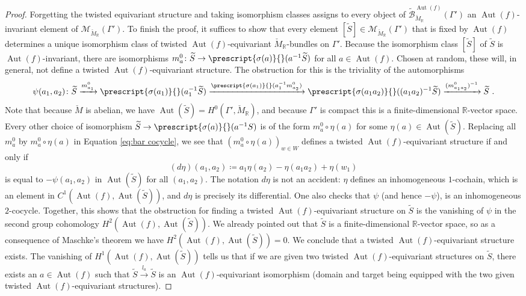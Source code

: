 \documentclass[10pt, a4paper]{amsart}
\theoremstyle{definition}
\theoremstyle{myitemstyle}
\newcommand{\R}{\mathbb{R}}
\newcommand{\Mcheck}{{\check{M}}}
\newcommand{\mc}[1]{{\mathcal{#1}}}
\newcommand{\wmc}[1]{{\widetilde{\mathcal{#1}}}}
\DeclareMathOperator{\Aut}{Aut}
\begin{document}
\begin{proof}
Forgetting the twisted equivariant structure and taking isomorphism classes assigns to every object of $\wmc B^{\Aut(f)}_{\Mcheck_\R}(\Gamma')$ an $\Aut(f)$-invariant element of $\mc M_{\Mcheck_\R}(\Gamma')$. To finish the proof, it suffices to show that every element  $[\widetilde S]\in\mc M_{\Mcheck_\R}(\Gamma')$ that is fixed by $\Aut(f)$ determines a unique isomorphism class of twisted $\Aut(f)$-equivariant $\Mcheck_\R$-bundles on $\Gamma'$. 
 Because the isomorphism class $[\widetilde S]$ of  $\widetilde S$ is $\Aut(f)$-invariant, there are isomorphisms $m^0_a\colon \widetilde S\to \prescript{\sigma(a)}{}(a^{-1}\widetilde S)$ for all $a\in \Aut(f)$. Chosen at random, these will, in general, not define a twisted $\Aut(f)$-equivariant structure. The obstruction for this is the triviality of the automorphisms
\begin{equation}
\label{eq:bar cocycle}
    \psi(a_1,a_2) \colon \widetilde S
    \xrightarrow{m^0_{a_1}} \prescript{\sigma(a_1)}{}(a_1^{-1}\widetilde S)
    \xrightarrow{\prescript{\sigma(a_1)}{}(a_1^{-1}m^0_{a_2})} \prescript{\sigma(a_1a_2)}{}((a_1a_2)^{-1}\widetilde S)
    \xrightarrow{(m^0_{a_1a_2})^{-1}} \widetilde S    \ .
\end{equation}
Note that because $\Mcheck$ is abelian, we have $\Aut(\widetilde S)= H^0(\Gamma', \Mcheck_\R)$, and because $\Gamma'$ is compact this is a finite-dimensional $\R$-vector space. Every other choice of isomorphism $\widetilde S\to \prescript{\sigma(a)}{}(a^{-1}S)$ is of the form $m^0_a\circ \eta(a)$ for some $\eta(a)\in \Aut(\widetilde S)$. Replacing all $m_{a}^0$ by $m_a^0\circ \eta(a)$ in Equation \eqref{eq:bar cocycle}, we see that $(m_a^0\circ \eta(a))_{w\in W}$ defines a twisted $\Aut(f)$-equivariant structure if and only if 
\[
    (d\eta)(a_1,a_2)\coloneqq a_1\eta(a_2)-\eta(a_1 a_2)+\eta(w_1)
\]
is equal to $-\psi(a_1,a_2)$ in $\Aut(\widetilde S)$ for all $(a_1,a_2)$. The notation $d\eta$ is not an accident: $\eta$ defines an inhomogeneous $1$-cochain, which is an element in $C^1(\Aut(f), \Aut(\widetilde S))$, and $d\eta$ is precisely its differential. One also checks that $\psi$ (and hence $-\psi$), is an inhomogeneous $2$-cocycle. Together, this shows that the obstruction for finding a twisted $\Aut(f)$-equivariant structure on $\widetilde S$ is the vanishing of $\psi$ in the second group cohomology $H^2(\Aut(f),\Aut(\widetilde S))$. We already pointed out that $\widetilde S$ is a finite-dimensional $\R$-vector space, so as a consequence of Maschke's theorem we have $H^2(\Aut(f),\Aut(\widetilde S))=0$. We conclude that a twisted $\Aut(f)$-equivariant structure exists. The vanishing of $H^1(\Aut(f),\Aut(\widetilde S))$ tells us that if we are given two twisted $\Aut(f)$-equivariant structures on $\widetilde S$, there exists an $a\in \Aut(f)$ such that $\widetilde S\xrightarrow{l_a} \widetilde S$ is an $\Aut(f)$-equivariant isomorphism (domain and target being equipped with the two given twisted $\Aut(f)$-equivariant structures).
\end{proof}
\end{document}
